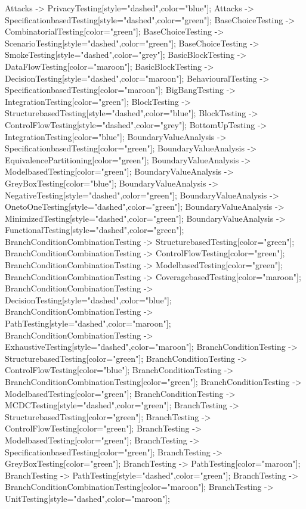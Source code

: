 \documentclass{article}
\begin{document}
{Attacks -> PrivacyTesting[style="dashed",color="blue"];
Attacks -> SpecificationbasedTesting[style="dashed",color="green"];
BaseChoiceTesting -> CombinatorialTesting[color="green"];
BaseChoiceTesting -> ScenarioTesting[style="dashed",color="green"];
BaseChoiceTesting -> SmokeTesting[style="dashed",color="grey"];
BasicBlockTesting -> DataFlowTesting[color="maroon"];
BasicBlockTesting -> DecisionTesting[style="dashed",color="maroon"];
BehaviouralTesting -> SpecificationbasedTesting[color="maroon"];
BigBangTesting -> IntegrationTesting[color="green"];
BlockTesting -> StructurebasedTesting[style="dashed",color="blue"];
BlockTesting -> ControlFlowTesting[style="dashed",color="grey"];
BottomUpTesting -> IntegrationTesting[color="blue"];
BoundaryValueAnalysis -> SpecificationbasedTesting[color="green"];
BoundaryValueAnalysis -> EquivalencePartitioning[color="green"];
BoundaryValueAnalysis -> ModelbasedTesting[color="green"];
BoundaryValueAnalysis -> GreyBoxTesting[color="blue"];
BoundaryValueAnalysis -> NegativeTesting[style="dashed",color="green"];
BoundaryValueAnalysis -> OnetoOneTesting[style="dashed",color="green"];
BoundaryValueAnalysis -> MinimizedTesting[style="dashed",color="green"];
BoundaryValueAnalysis -> FunctionalTesting[style="dashed",color="green"];
BranchConditionCombinationTesting -> StructurebasedTesting[color="green"];
BranchConditionCombinationTesting -> ControlFlowTesting[color="green"];
BranchConditionCombinationTesting -> ModelbasedTesting[color="green"];
BranchConditionCombinationTesting -> CoveragebasedTesting[color="maroon"];
BranchConditionCombinationTesting -> DecisionTesting[style="dashed",color="blue"];
BranchConditionCombinationTesting -> PathTesting[style="dashed",color="maroon"];
BranchConditionCombinationTesting -> ExhaustiveTesting[style="dashed",color="maroon"];
BranchConditionTesting -> StructurebasedTesting[color="green"];
BranchConditionTesting -> ControlFlowTesting[color="blue"];
BranchConditionTesting -> BranchConditionCombinationTesting[color="green"];
BranchConditionTesting -> ModelbasedTesting[color="green"];
BranchConditionTesting -> MCDCTesting[style="dashed",color="green"];
BranchTesting -> StructurebasedTesting[color="green"];
BranchTesting -> ControlFlowTesting[color="green"];
BranchTesting -> ModelbasedTesting[color="green"];
BranchTesting -> SpecificationbasedTesting[color="green"];
BranchTesting -> GreyBoxTesting[color="green"];
BranchTesting -> PathTesting[color="maroon"];
BranchTesting -> PathTesting[style="dashed",color="green"];
BranchTesting -> BranchConditionCombinationTesting[color="maroon"];
BranchTesting -> UnitTesting[style="dashed",color="maroon"];
}
\end{document}
